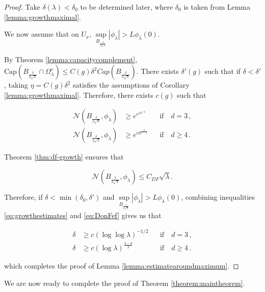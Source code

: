 \documentclass{amsart}
\begin{document}
\begin{proof}
Take $\delta(\lambda) < \delta_0$ to be determined later, where $\delta_0$ is taken from Lemma \ref{lemma:growthmaximal}. 
 
 We now assume that on $U_x$, $\sup\limits_{B_{\frac{\delta}{2 \sqrt{\lambda}}}}|\phi_\lambda| > L \phi_\lambda (0)$.

 By Theorem \ref{lemma:capacitycomplement}, $\text{Cap}(B_{\frac{\delta}{2 \sqrt{\lambda}}} \cap \Omega_{\lambda}^c) \leq C(g)\delta^2 Cap(B_{\frac{\delta}{2 \sqrt{\lambda}}})$. There exists $\delta'(g)$ such that if $\delta < \delta'$, taking $\eta = C(g)\delta^2$ satisfies the assumptions of Corollary \ref{lemma:growthmaximal}. Therefore,  there exists $c(g)$ such that

\begin{align}\label{eq:growthestimates}
    \mathcal{N}(B_{\frac{\delta}{2 \sqrt{\lambda}}},\phi_\lambda) &\geq e^{e^{c \delta^{-2}}} &&  \text{if}\quad d=3\, ,\nonumber\\
 \mathcal{N}(B_{\frac{\delta}{2 \sqrt{\lambda}}},\phi_\lambda) &\geq e^{c \delta^{\frac{2}{3-d}}} && \text{if}\quad d \geq 4 \, .
 \end{align}

 Theorem \ref{thm:df-growth} ensures that

\begin{equation}\label{eq:DonFef}
    \mathcal{N}(B_{\frac{\delta}{2 \sqrt{\lambda}}},\phi_\lambda)\leq C_{DF}\sqrt{\lambda}.
\end{equation}


Therefore, if $\delta< \min(\delta_0, \delta')$ and $\sup\limits_{B_{\frac{\delta}{2 \sqrt{\lambda}}}}|\phi_\lambda| > L \phi_\lambda (0)$,  combining inequalities \eqref{eq:growthestimates} and \eqref{eq:DonFef} gives us that

\begin{align}
   \delta &\geq c (\log\log\lambda)^{-1/2} && \text{if} \quad  d=3 \, ,\\
   \delta &\geq c (\log\lambda)^{\frac{3-d}{2}} && \text{if} \quad  d \geq 4 \, .
\end{align}

which completes the proof of Lemma \ref{lemma:estimatearoundmaximum}.

    
\end{proof}


We are now ready to complete the proof of Theorem \ref{theorem:maintheorem}.
\end{document}
